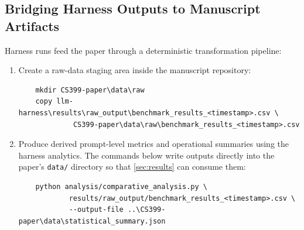 \subsection{Bridging Harness Outputs to Manuscript Artifacts}
\label{subsec:paper_bridge}

Harness runs feed the paper through a deterministic transformation pipeline:
\begin{enumerate}
	\item Create a raw-data staging area inside the manuscript repository:
	\begin{verbatim}
	mkdir CS399-paper\data\raw
	copy llm-harness\results\raw_output\benchmark_results_<timestamp>.csv \
			 CS399-paper\data\raw\benchmark_results_<timestamp>.csv
	\end{verbatim}
	\item Produce derived prompt-level metrics and operational summaries using the harness analytics. The commands below write outputs directly into the paper's \texttt{data/} directory so that \cref{sec:results} can consume them:
	\begin{verbatim}
	python analysis/comparative_analysis.py \
			results/raw_output/benchmark_results_<timestamp>.csv \
			--output-file ..\CS399-paper\data\statistical_summary.json


\end{verbatim}
\end{enumerate}
